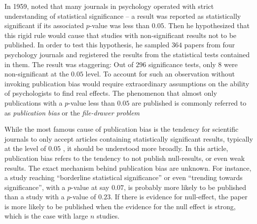 In 1959, \citeauthor{sterling_publication_1959} noted that many journals
in psychology operated with strict understanding of statistical significance
-- a result was reported as statistically significant if its associated
$p$-value was less than $0.05$. Then he hypothesized that this rigid
rule would cause that studies with non-significant results not to
be published. In order to test this hypothesis, he sampled $364$
papers from four psychology journals and registered the results from
the statistical tests contained in them. The result was staggering:
Out of $296$ significance tests, only $8$ were non-significant at
the $0.05$ level. To account for such an observation without invoking
publication bias would require extraordinary assumptions on the ability
of psychologists to find real effects. The phenomenon that almost
only publications with a $p$-value less than $0.05$ are published
is commonly referred to as \emph{publication bias} or the \emph{file-drawer
problem \parencite{rosenthal_file_1979}}

While the most famous cause of publication bias is the tendency for
scientific journals to only accept articles containing statistically
significant results, typically at the level of $0.05$ \parencite{simmons_false-positive_2011},
it should be understood more broadly. In this article, publication
bias refers to the tendency to not publish null-results, or even weak
results. The exact mechanism behind publication bias are unknown.
For instance, a study reaching ``borderline statistical significance''
or even ``trending towards significance'', with a $p$-value at
say $0.07$, is probably more likely to be published than a study
with a $p$-value of $0.23$. If there is evidence for null-effect,
the paper is more likely to be published when the evidence for the
null effect is strong, which is the case with large $n$ studies. 

